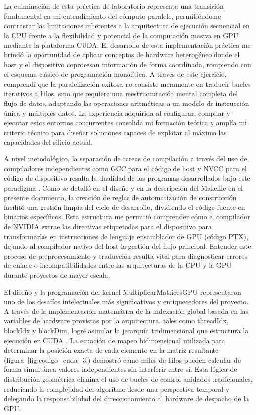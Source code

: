 La culminación de esta práctica de laboratorio representa una transición fundamental en mi entendimiento del cómputo paralelo, permitiéndome contrastar las limitaciones inherentes a la arquitectura de ejecución secuencial en la CPU frente a la flexibilidad y potencial de la computación masiva en GPU mediante la plataforma CUDA. El desarrollo de esta implementación práctica me brindó la oportunidad de aplicar conceptos de hardware heterogéneo donde el host y el dispositivo coprocesan información de forma coordinada, rompiendo con el esquema clásico de programación monolítica. A través de este ejercicio, comprendí que la paralelización exitosa no consiste meramente en traducir bucles iterativos a hilos, sino que requiere una reestructuración mental completa del flujo de datos, adaptando las operaciones aritméticas a un modelo de instrucción única y múltiples datos. La experiencia adquirida al configurar, compilar y ejecutar estos entornos concurrentes consolida mi formación teórica y amplía mi criterio técnico para diseñar soluciones capaces de explotar al máximo las capacidades del silicio actual.

A nivel metodológico, la separación de tareas de compilación a través del uso de compiladores independientes como GCC para el código de host y NVCC para el código de dispositivo resalta la dualidad de los programas desarrollados bajo este paradigma \cite{nvccGuide}. Como se detalló en el diseño y en la descripción del Makefile en el presente documento, la creación de reglas de automatización de construcción facilitó una gestión limpia del ciclo de desarrollo, dividiendo el código fuente en binarios específicos. Esta estructura me permitió comprender cómo el compilador de NVIDIA extrae las directivas etiquetadas para el dispositivo para transformarlas en instrucciones de lenguaje ensamblador de GPU (código PTX), dejando al compilador nativo del host la gestión del flujo principal. Entender este proceso de preprocesamiento y traducción resulta vital para diagnosticar errores de enlace o incompatibilidades entre las arquitecturas de la CPU y la GPU durante proyectos de mayor escala.

El diseño y la programación del kernel MultiplicarMatricesGPU representaron uno de los desafíos intelectuales más significativos y enriquecedores del proyecto. A través de la implementación matemática de la indexación global basada en las variables de hardware provistas por la arquitectura, tales como threadIdx, blockIdx y blockDim, logré asimilar la jerarquía tridimensional que estructura la ejecución en CUDA \cite{threadIndexing}. La ecuación de mapeo bidimensional utilizada para determinar la posición exacta de cada elemento en la matriz resultante (figura~\ref{fig:codigo_cuda_3}) demostró cómo miles de hilos pueden calcular de forma simultánea valores independientes sin interferir entre sí. Esta lógica de distribución geométrica elimina el uso de bucles de control anidados tradicionales, reduciendo la complejidad del algoritmo desde una perspectiva temporal y delegando la responsabilidad del direccionamiento al hardware de despacho de la GPU.

